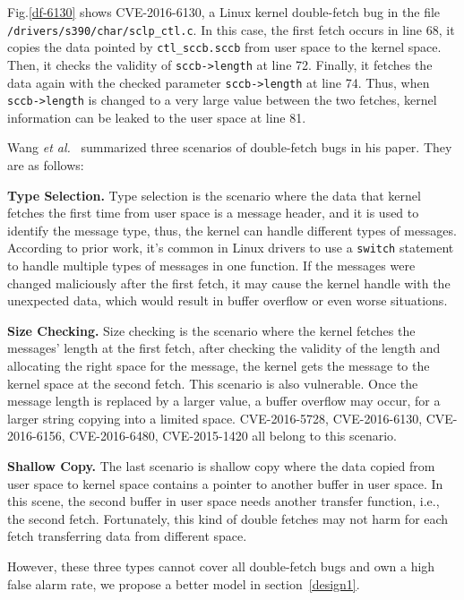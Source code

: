 \documentclass[10pt]{llncs}
\begin{document}
Fig.\ref{df-6130} shows CVE-2016-6130, a Linux kernel double-fetch bug in the file \verb:/drivers/s390/char/sclp_ctl.c:. In this case, the first fetch occurs in line 68, it copies the data pointed by \verb:ctl_sccb.sccb: from user space to the kernel space. Then, it checks the validity of \verb:sccb->length: at line 72. Finally, it fetches the data again with the checked parameter \verb:sccb->length: at line 74. Thus, when \verb:sccb->length: is changed to a very large value between the two fetches, kernel information can be leaked to the user space at line 81.

Wang \textit{et al.}~\cite{wang} summarized three scenarios of double-fetch bugs in his paper. They are as follows:

\textbf{Type Selection.}
Type selection is the scenario where the data that kernel fetches the first time from user space is a message header, and it is used to identify the message type, thus, the kernel can handle different types of messages. According to prior work, it's common in Linux drivers to use a \verb:switch: statement to handle multiple types of messages in one function. If the messages were changed maliciously after the first fetch, it may cause the kernel handle with the unexpected data, which would result in buffer overflow or even worse situations.

\textbf{Size Checking.}
Size checking is the scenario where the kernel fetches the messages' length at the first fetch, after checking the validity of the length and allocating the right space for the message, the kernel gets the message to the kernel space at the second fetch. This scenario is also vulnerable. Once the message length is replaced by a larger value, a buffer overflow may occur, for a larger string copying into a limited space. CVE-2016-5728, CVE-2016-6130, CVE-2016-6156, CVE-2016-6480, CVE-2015-1420 all belong to this scenario.

\textbf{Shallow Copy.}
The last scenario is shallow copy where the data copied from user space to kernel space contains a pointer to another buffer in user space. In this scene, the second buffer in user space needs another transfer function, i.e., the second fetch. Fortunately, this kind of double fetches may not harm for each fetch transferring data from different space.

However, these three types cannot cover all double-fetch bugs and own a high false alarm rate, we propose a better model in section~\ref{design1}.
\end{document}
